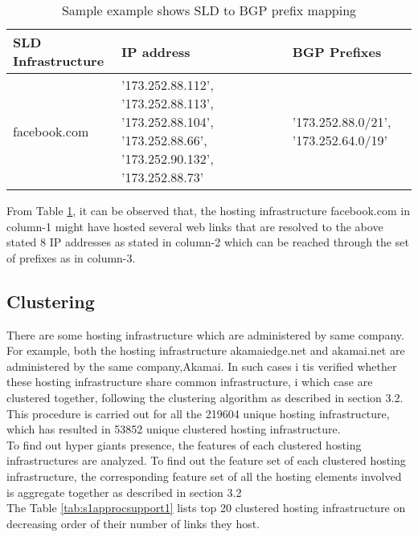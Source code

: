 \begin{table}[htb]
\centering
\begin{tabular}[t]{|p{}|p{}||p{}|}
\hline
SLD Infrastructure     & IP address&BGP Prefixes\\
\hline
\hline
facebook.com   & '173.252.88.112', '173.252.88.113', '173.252.88.104', '173.252.88.66', '173.252.90.132', '173.252.88.73'    &'173.252.88.0/21', '173.252.64.0/19'\\
\hline
\end{tabular}
\caption{Sample example shows SLD to BGP prefix mapping}
\label{tab:s1approcsupport}
\end{table}


\noindent From Table \ref{tab:s1approcsupport}, it can be observed that, the hosting infrastructure facebook.com in column-1 might have hosted several web links that are resolved to the above stated 8 IP addresses as stated in column-2 which can be reached through the set of prefixes as in column-3.\\

\subsection{Clustering}
\noindent There are some hosting infrastructure which are administered by same company. For example, both the hosting infrastructure akamaiedge.net and akamai.net are administered by the same company,Akamai. In such cases i tis verified whether these hosting infrastructure share common infrastructure, i which case are clustered together, following the clustering algorithm as described in section 3.2. This procedure is carried out for all the 219604 unique hosting infrastructure, which has resulted in 53852 unique clustered hosting infrastructure.\\

\noindent To find out hyper giants presence, the features of each clustered hosting infrastructures are analyzed. To find out the feature set of each clustered hosting infrastructure, the corresponding feature set of all the hosting elements involved is aggregate together as described in section 3.2\\

\noindent The  Table \ref{tab:s1approcsupport1} lists top 20 clustered hosting infrastructure on decreasing order of their number of links they host.\\\

